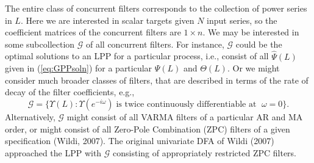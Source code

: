 \documentclass[a4paper]{book}
\begin{document}
 The entire class of concurrent filters corresponds to 
  the collection of power series in $L$.  Here we are interested in 
 scalar targets given $N$ input series, so the coefficient matrices of the
 concurrent filters are $1 \times n$.  We may be interested in some subcollection
 $\mathcal{G}$ of all concurrent filters.  For instance, $\mathcal{G}$ could
 be the optimal solutions to an LPP for a particular process, i.e., consist of
 all $\widehat{\Psi} (L)$ given in (\ref{eq:GPPsoln}) for a particular $\Psi (L)$ and
 $\Theta (L)$.  Or we might consider much broader classes of filters, that are 
 described in terms of the rate of decay of the filter coefficients, e.g.,
\[
  \mathcal{G} = \{ \Upsilon (L) : \Upsilon (e^{-i \omega}) \;
  \mbox{is twice continuously differentiable at } \; \omega = 0 \}.
\]
  Alternatively, $\mathcal{G}$ might consist of all VARMA filters of a
 particular AR and MA order, or might consist of all Zero-Pole
 Combination (ZPC) filters of a given specification (Wildi, 2007).
 The original univariate DFA of Wildi (2007) approached the LPP with
 $\mathcal{G}$ consisting of appropriately restricted ZPC filters.
\end{document}
